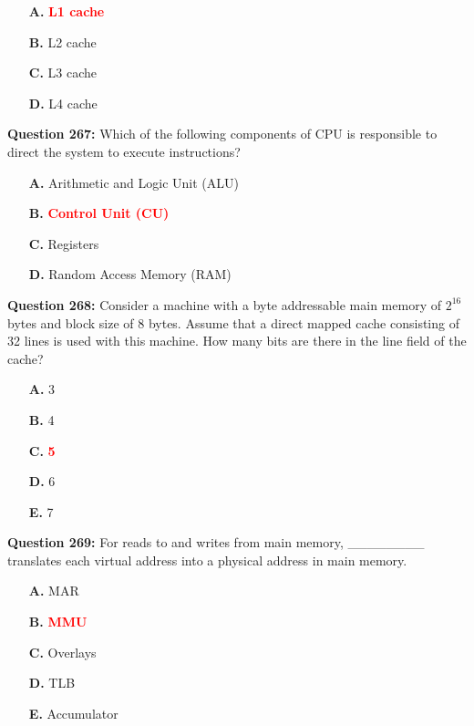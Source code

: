 \documentclass[12pt,a4paper]{article}
\begin{document}
\begin{itemize}
    \item[\textbf{A.}] \textcolor{red}{\textbf{L1 cache}}
    \item[\textbf{B.}] L2 cache
    \item[\textbf{C.}] L3 cache
    \item[\textbf{D.}] L4 cache
\end{itemize}

\vspace{0.5cm}

\textbf{Question 267:} Which of the following components of CPU is responsible to direct the system to execute instructions?

\begin{itemize}
    \item[\textbf{A.}] Arithmetic and Logic Unit (ALU)
    \item[\textbf{B.}] \textcolor{red}{\textbf{Control Unit (CU)}}
    \item[\textbf{C.}] Registers
    \item[\textbf{D.}] Random Access Memory (RAM)
\end{itemize}

\vspace{0.5cm}

\textbf{Question 268:} Consider a machine with a byte addressable main memory of $2^{16}$ bytes and block size of 8 bytes. Assume that a direct mapped cache consisting of 32 lines is used with this machine. How many bits are there in the line field of the cache?

\begin{itemize}
    \item[\textbf{A.}] 3
    \item[\textbf{B.}] 4
    \item[\textbf{C.}] \textcolor{red}{\textbf{5}}
    \item[\textbf{D.}] 6
    \item[\textbf{E.}] 7
\end{itemize}

\vspace{0.5cm}

\textbf{Question 269:} For reads to and writes from main memory, ________ translates each virtual address into a physical address in main memory.

\begin{itemize}
    \item[\textbf{A.}] MAR
    \item[\textbf{B.}] \textcolor{red}{\textbf{MMU}}
    \item[\textbf{C.}] Overlays
    \item[\textbf{D.}] TLB
    \item[\textbf{E.}] Accumulator
\end{itemize}
\end{document}
